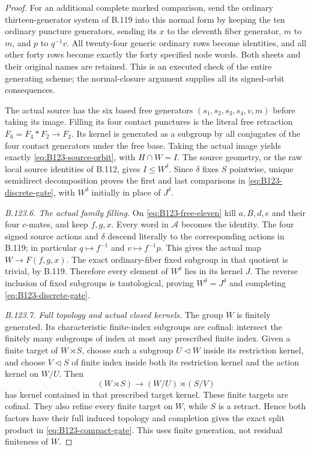 \begin{proof}
For an additional complete marked comparison, send the ordinary
thirteen-generator system of B.119 into this normal form by keeping
the ten ordinary puncture generators, sending its $x$ to the
eleventh fiber generator, $m$ to $m$, and $p$ to $q^{-1}v$.
All twenty-four generic ordinary rows become identities, and
all other forty rows become exactly the forty specified node
words. Both sheets and their original names are retained. This
is an executed check of the entire generating scheme; the
normal-closure argument supplies all its signed-orbit consequences.

The actual source has the six based free generators
$(s_1,s_2,s_3,s_4,v,m)$ before taking its image. Filling its
four contact punctures is the literal free retraction
$F_6=F_4*F_2\to F_2$. Its kernel is generated as a subgroup
by all conjugates of the four contact generators under the
free base. Taking the actual image yields exactly
\eqref{eq:B123-source-orbit}, with $H\cap W=I$.
The source geometry, or the raw local source identities of
B.112, gives $I\leq W^\delta$. Since $\delta$ fixes $S$
pointwise, unique semidirect decomposition proves the first
and last comparisons in \eqref{eq:B123-discrete-gate}, with
$W^\delta$ initially in place of $J^\delta$.

\emph{B.123.6. The actual family filling.}
On \eqref{eq:B123-free-eleven} kill $a,B,d,e$ and their
four $c$-mates, and keep $f,g,x$. Every word in
$\mathcal A$ becomes the identity. The four signed source
actions and $\delta$ descend literally to the corresponding
actions in B.119; in particular $q\mapsto f^{-1}$ and
$v\mapsto f^{-1}p$. This gives the actual map $W\to F(f,g,x)$.
The exact ordinary-fiber fixed subgroup in that quotient is
trivial, by B.119. Therefore every element of $W^\delta$ lies
in its kernel $J$. The reverse inclusion of fixed subgroups is
tautological, proving $W^\delta=J^\delta$ and completing
\eqref{eq:B123-discrete-gate}.

\emph{B.123.7. Full topology and actual closed kernels.}
The group $W$ is finitely generated. Its characteristic finite-index
subgroups are cofinal: intersect the finitely many subgroups of
index at most any prescribed finite index. Given a finite target
of $W\rtimes S$, choose such a subgroup $U\lhd W$ inside its
restriction kernel, and choose $V\lhd S$ of finite index inside
both its restriction kernel and the action kernel on $W/U$.
Then
\[
 (W\rtimes S)\longrightarrow(W/U)\rtimes(S/V)
\]
has kernel contained in that prescribed target kernel. These
finite targets are cofinal. They also refine every finite target
on $W$, while $S$ is a retract. Hence both factors have their
full induced topology and completion gives the exact split
product in \eqref{eq:B123-compact-gate}. This uses finite
generation, not residual finiteness of $W$.


\end{proof}
